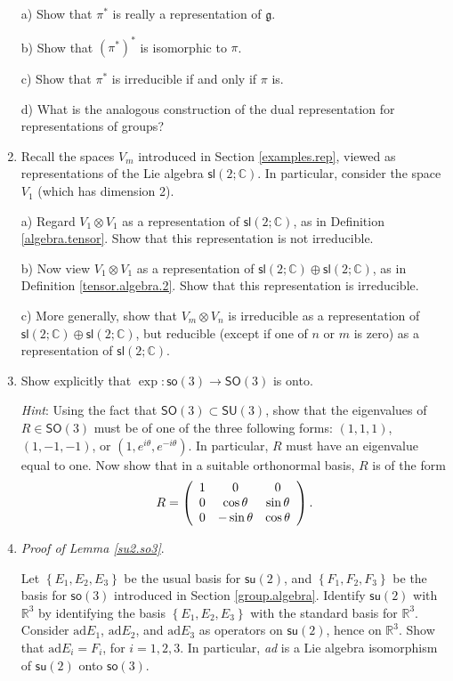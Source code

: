 \documentclass[12pt]{amsbook}
\let \frak = \mathfrak
\theoremstyle{plain}
\numberwithin{equation}{chapter}
\numberwithin{theorem}{chapter}
\begin{document}
\begin{enumerate}
a) Show that $\pi^{\ast}$ is really a representation of $\frak{g}$.

b) Show that $\left(  \pi^{\ast}\right)  ^{\ast}$ is isomorphic to $\pi$.

c) Show that $\pi^{\ast}$ is irreducible if and only if $\pi$ is.

d) What is the analogous construction of the dual representation for
representations of groups?

\item \label{c.g}Recall the spaces $V_{m}$ introduced in Section
\ref{examples.rep}, viewed as representations of the Lie algebra
$\mathsf{sl}(2;\mathbb{C})$. In particular, consider the space $V_{1}$ (which
has dimension 2).

a) Regard $V_{1}\otimes V_{1}$ as a representation of $\mathsf{sl}%
(2;\mathbb{C})$, as in Definition \ref{algebra.tensor}. Show that this
representation is not irreducible.

b) Now view $V_{1}\otimes V_{1}$ as a representation of $\mathsf{sl}%
(2;\mathbb{C})\oplus\mathsf{sl}(2;\mathbb{C})$, as in Definition
\ref{tensor.algebra.2}. Show that this representation is irreducible.

c) More generally, show that $V_{m}\otimes V_{n}$ is irreducible as a
representation of $\mathsf{sl}(2;\mathbb{C})\oplus\mathsf{sl}(2;\mathbb{C})$,
but reducible (except if one of $n$ or $m$ is zero) as a representation of
$\mathsf{sl}(2;\mathbb{C})$.

\item  Show explicitly that $\exp:\mathsf{so}(3)\rightarrow\mathsf{SO}(3)$ is onto.

\textit{Hint}: Using the fact that $\mathsf{SO}(3)\subset\mathsf{SU}(3)$, show
that the eigenvalues of $R\in\mathsf{SO}(3)$ must be of one of the three
following forms: $(1,1,1)$, $(1,-1,-1)$, or $(1,e^{i\theta},e^{-i\theta})$. In
particular, $R$ must have an eigenvalue equal to one. Now show that in a
suitable orthonormal basis, $R$ is of the form
\[
R=\left(
\begin{array}
[c]{ccc}%
1 & 0 & 0\\
0 & \cos\theta & \sin\theta\\
0 & -\sin\theta & \cos\theta
\end{array}
\right)  \text{.}%
\]

\item \label{prove.su2.so3}\textit{Proof of Lemma \ref{su2.so3}}.

Let $\left\{  E_{1},E_{2},E_{3}\right\}  $ be the usual basis for
$\mathsf{su}(2)$, and $\left\{  F_{1},F_{2},F_{3}\right\}  $ be the basis for
$\mathsf{so}(3)$ introduced in Section \ref{group.algebra}. Identify
$\mathsf{su}(2)$ with $\mathbb{R}^{3}$ by identifying the basis $\left\{
E_{1},E_{2},E_{3}\right\}  $ with the standard basis for $\mathbb{R}^{3}$.
Consider $\mathrm{ad}E_{1}$, $\mathrm{ad}E_{2}$, and $\mathrm{ad}E_{3}$ as
operators on $\mathsf{su}(2)$, hence on $\mathbb{R}^{3}$. Show that
$\mathrm{ad}E_{i}=F_{i}$, for $i=1,2,3$. In particular, \textit{ad} is a Lie
algebra isomorphism of $\mathsf{su}(2)$ onto $\mathsf{so}(3)$.


\end{enumerate}
\end{document}
